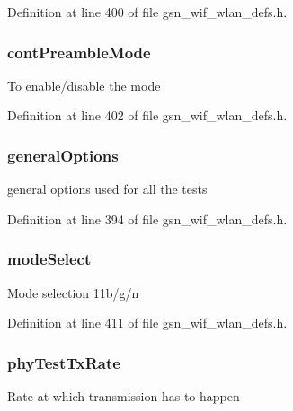Definition at line 400 of file gsn\_\-wif\_\-wlan\_\-defs.h.

\hypertarget{a00189_a0100696bb872bc8447937bc0e7c786bd}{
\subsubsection[{contPreambleMode}]{ {\bf contPreambleMode}}}
\label{a00189_a0100696bb872bc8447937bc0e7c786bd}
To enable/disable the mode 

Definition at line 402 of file gsn\_\-wif\_\-wlan\_\-defs.h.

\hypertarget{a00189_a5e4e9e8d2b76fbb6bdf201c4aeddd60d}{
\subsubsection[{generalOptions}]{ {\bf generalOptions}}}
\label{a00189_a5e4e9e8d2b76fbb6bdf201c4aeddd60d}
general options used for all the tests 

Definition at line 394 of file gsn\_\-wif\_\-wlan\_\-defs.h.

\hypertarget{a00189_a28cb0da8ec076a6515b226010038aa46}{
\subsubsection[{modeSelect}]{ {\bf modeSelect}}}
\label{a00189_a28cb0da8ec076a6515b226010038aa46}
Mode selection 11b/g/n 

Definition at line 411 of file gsn\_\-wif\_\-wlan\_\-defs.h.

\hypertarget{a00189_a7251d0e1cb1d341e0ce219c75c5ce68b}{
\subsubsection[{phyTestTxRate}]{ {\bf phyTestTxRate}}}
\label{a00189_a7251d0e1cb1d341e0ce219c75c5ce68b}
Rate at which transmission has to happen 

